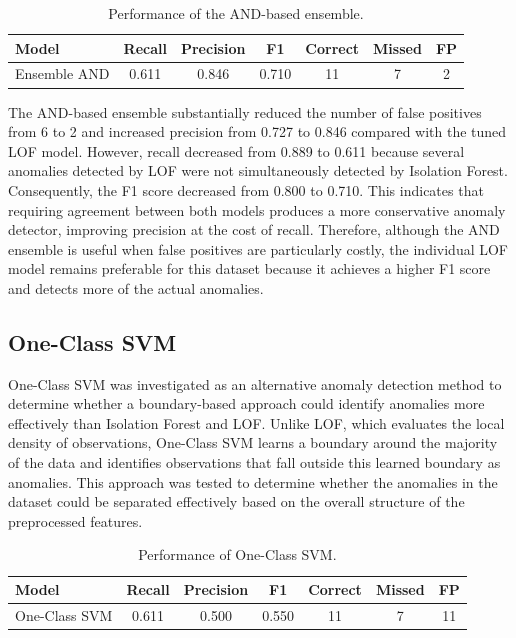 \documentclass[a4paper,12pt]{article}
\begin{document}
\begin{table}
	\centering
	\small
	\setlength{\tabcolsep}{5pt}
	\caption{Performance of the AND-based ensemble.}
	\label{tab:ensemble_and}
	\begin{tabular}{lcccccc}
		\hline
		Model & Recall & Precision & F1 & Correct & Missed & FP \\
		\hline
		Ensemble AND & 0.611 & 0.846 & 0.710 & 11 & 7 & 2 \\
		\hline
	\end{tabular}
\end{table}

The AND-based ensemble substantially reduced the number of false positives from 6 to 2 and increased precision from 0.727 to 0.846 compared with the tuned LOF model. However, recall decreased from 0.889 to 0.611 because several anomalies detected by LOF were not simultaneously detected by Isolation Forest. Consequently, the F1 score decreased from 0.800 to 0.710. This indicates that requiring agreement between both models produces a more conservative anomaly detector, improving precision at the cost of recall. Therefore, although the AND ensemble is useful when false positives are particularly costly, the individual LOF model remains preferable for this dataset because it achieves a higher F1 score and detects more of the actual anomalies.

\subsection{One-Class SVM}

One-Class SVM was investigated as an alternative anomaly detection method to determine whether a boundary-based approach could identify anomalies more effectively than Isolation Forest and LOF. Unlike LOF, which evaluates the local density of observations, One-Class SVM learns a boundary around the majority of the data and identifies observations that fall outside this learned boundary as anomalies. This approach was tested to determine whether the anomalies in the dataset could be separated effectively based on the overall structure of the preprocessed features.

\begin{table}
	\centering
	\small
	\setlength{\tabcolsep}{5pt}
	\caption{Performance of One-Class SVM.}
	\label{tab:ocsvm}
	\begin{tabular}{lcccccc}
		\hline
		Model & Recall & Precision & F1 & Correct & Missed & FP \\
		\hline
		One-Class SVM & 0.611 & 0.500 & 0.550 & 11 & 7 & 11 \\
		\hline
	\end{tabular}
\end{table}
\end{document}
